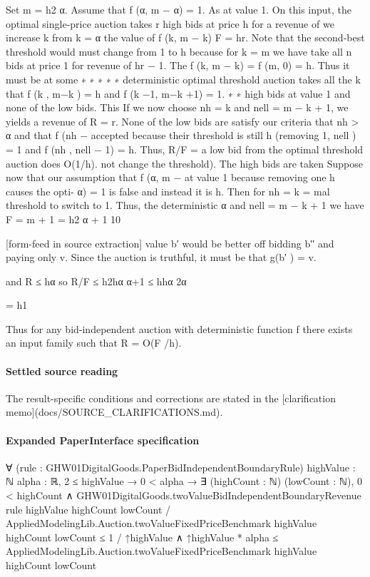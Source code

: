 \documentclass[10pt]{article}
\begin{document}
\begin{ReviewVerbatim}
Set m = h2 α. Assume that f (α, m − α) = 1. As
at value 1. On this input, the optimal single-price
auction takes r high bids at price h for a revenue of we increase k from k = α the value of f (k, m − k)
F = hr. Note that the second-best threshold would must change from 1 to h because for k = m we have
take all n bids at price 1 for revenue of hr − 1. The f (k, m − k) = f (m, 0) = h. Thus it must be at some
∗
∗
∗
∗
∗
deterministic optimal threshold auction takes all the k that f (k , m−k ) = h and f (k −1, m−k +1) = 1.
∗
∗
high bids at value 1 and none of the low bids. This If we now choose nh = k and nell = m − k + 1, we
yields a revenue of R = r. None of the low bids are satisfy our criteria that nh > α and that f (nh −
accepted because their threshold is still h (removing 1, nell ) = 1 and f (nh , nell − 1) = h. Thus, R/F =
a low bid from the optimal threshold auction does O(1/h).
not change the threshold). The high bids are taken
Suppose now that our assumption that f (α, m −
at value 1 because removing one h causes the opti- α) = 1 is false and instead it is h. Then for nh = k =
mal threshold to switch to 1. Thus, the deterministic α and nell = m − k + 1 we have F = m + 1 = h2 α + 1
10


[form-feed in source extraction]
value b′ would be better off bidding b′′ and paying only v. Since the auction is truthful, it must
be that g(b′ ) = v.

and R ≤ hα so
R/F ≤ h2hα
α+1
≤ hhα
2α

= h1

Thus for any bid-independent auction with deterministic function f there exists an input family such
that R = O(F /h).
\end{ReviewVerbatim}

\paragraph{Settled source reading}
\begin{sloppypar}
The result-\allowbreak{}specific conditions and corrections are stated in the [clarification memo](docs/\allowbreak{}SOURCE\_\allowbreak{}CLARIFICATIONS.\allowbreak{}md).\allowbreak{}
\end{sloppypar}

\paragraph{Expanded PaperInterface specification}
\begin{ReviewVerbatim}
∀ (rule : GHW01DigitalGoods.PaperBidIndependentBoundaryRule) {highValue : ℕ} {alpha : ℝ},
  2 ≤ highValue →
    0 < alpha →
      ∃ (highCount : ℕ) (lowCount : ℕ),
        0 < highCount ∧
          GHW01DigitalGoods.twoValueBidIndependentBoundaryRevenue rule highValue highCount lowCount /
                AppliedModelingLib.Auction.twoValueFixedPriceBenchmark highValue highCount lowCount ≤
              1 / ↑highValue ∧
            ↑highValue * alpha ≤ AppliedModelingLib.Auction.twoValueFixedPriceBenchmark highValue highCount lowCount
\end{ReviewVerbatim}
\end{document}
